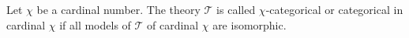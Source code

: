 Let $\chi$ be a cardinal number. The theory $\mathcal{T}$ is called $\chi$-categorical or categorical in cardinal $\chi$ if all models of $\mathcal{T}$ of cardinal $\chi$ are isomorphic.

